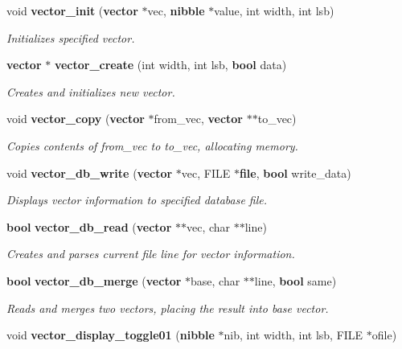 \begin{CompactItemize}
\item 
void {\bf vector\_\-init} ({\bf vector} $\ast$vec, {\bf nibble} $\ast$value, int width, int lsb)
\begin{CompactList}\small\item\em Initializes specified vector.\item\end{CompactList}\item 
{\bf vector} $\ast$ {\bf vector\_\-create} (int width, int lsb, {\bf bool} data)
\begin{CompactList}\small\item\em Creates and initializes new vector.\item\end{CompactList}\item 
void {\bf vector\_\-copy} ({\bf vector} $\ast$from\_\-vec, {\bf vector} $\ast$$\ast$to\_\-vec)
\begin{CompactList}\small\item\em Copies contents of from\_\-vec to to\_\-vec, allocating memory.\item\end{CompactList}\item 
void {\bf vector\_\-db\_\-write} ({\bf vector} $\ast$vec, FILE $\ast${\bf file}, {\bf bool} write\_\-data)
\begin{CompactList}\small\item\em Displays vector information to specified database file.\item\end{CompactList}\item 
{\bf bool} {\bf vector\_\-db\_\-read} ({\bf vector} $\ast$$\ast$vec, char $\ast$$\ast$line)
\begin{CompactList}\small\item\em Creates and parses current file line for vector information.\item\end{CompactList}\item 
{\bf bool} {\bf vector\_\-db\_\-merge} ({\bf vector} $\ast$base, char $\ast$$\ast$line, {\bf bool} same)
\begin{CompactList}\small\item\em Reads and merges two vectors, placing the result into base vector.\item\end{CompactList}\item 
void {\bf vector\_\-display\_\-toggle01} ({\bf nibble} $\ast$nib, int width, int lsb, FILE $\ast$ofile)

\end{CompactItemize}
